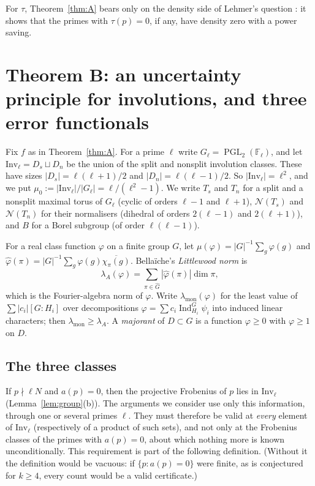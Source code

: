 \documentclass[11pt]{amsart}
\theoremstyle{definition}
\theoremstyle{remark}
\newcommand{\F}{\mathbb{F}}
\DeclareMathOperator{\PGL}{PGL}
\DeclareMathOperator{\Ind}{Ind}
\newcommand{\Inv}{\mathrm{Inv}}
\newcommand{\Nor}{\mathcal{N}}     %
\begin{document}
For $\tau$, Theorem~\ref{thm:A} bears only on the density side of Lehmer's question \cite{Leh47}: it shows that the
primes with $\tau(p)=0$, if any, have density zero with a power saving.

\section{Theorem B: an uncertainty principle for involutions, and three error functionals}\label{sec:B}

Fix $f$ as in Theorem~\ref{thm:A}. For a prime $\ell$ write $G_\ell=\PGL_2(\F_\ell)$, and let
$\Inv_\ell=D_s\sqcup D_n$ be the union of the split and nonsplit involution classes. These have sizes
$|D_s|=\ell(\ell+1)/2$ and $|D_n|=\ell(\ell-1)/2$. So $|\Inv_\ell|=\ell^2$, and we put
$\mu_0:=|\Inv_\ell|/|G_\ell|=\ell/(\ell^2-1)$. We write $T_s$ and $T_n$ for a split and a nonsplit maximal torus of
$G_\ell$ (cyclic of orders $\ell-1$ and $\ell+1$), $\Nor(T_s)$ and $\Nor(T_n)$ for their normalisers (dihedral of
orders $2(\ell-1)$ and $2(\ell+1)$), and $B$ for a Borel subgroup (of order $\ell(\ell-1)$).

For a real class function $\varphi$ on a finite group $G$, let $\mu(\varphi)=|G|^{-1}\sum_g\varphi(g)$ and
$\widehat\varphi(\pi)=|G|^{-1}\sum_g\varphi(g)\overline{\chi_\pi(g)}$. Bella\"iche's \emph{Littlewood norm}
\cite{Bel16} is
\[
  \lambda_A(\varphi)=\sum_{\pi\in\widehat G}|\widehat\varphi(\pi)|\dim\pi,
\]
which is the Fourier-algebra norm of $\varphi$. Write $\lambda_{\mathrm{mon}}(\varphi)$ for the least value of
$\sum|c_i|[G:H_i]$ over decompositions $\varphi=\sum c_i\Ind_{H_i}^G\psi_i$ into induced linear characters; then
$\lambda_{\mathrm{mon}}\ge\lambda_A$. A \emph{majorant} of $D\subset G$ is a function $\varphi\ge0$ with $\varphi\ge1$
on $D$.

\subsection{The three classes}\label{subsec:B-classes}

If $p\nmid\ell N$ and $a(p)=0$, then the projective Frobenius of $p$ lies in $\Inv_\ell$
(Lemma~\ref{lem:group}(b)). The arguments we consider use only this information, through one or several primes
$\ell$. They must therefore be valid at \emph{every} element of $\Inv_\ell$ (respectively of a product of such sets),
and not only at the Frobenius classes of the primes with $a(p)=0$, about which nothing more is known
unconditionally. This requirement is part of the following definition. (Without it the definition would be vacuous:
if $\{p:a(p)=0\}$ were finite, as is conjectured for $k\ge4$, every count would be a valid certificate.)
\end{document}
